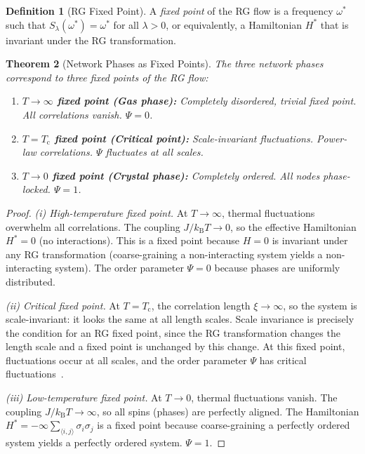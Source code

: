 \documentclass[11pt,twocolumn,a4paper]{article}
\newtheorem{theorem}{Theorem}[section]
\theoremstyle{definition}
\newtheorem{definition}[theorem]{Definition}
\newcommand{\kB}{k_{\mathrm{B}}}
\newcommand{\Tc}{T_{\mathrm{c}}}
\begin{document}
\begin{definition}[RG Fixed Point]\label{def:rg_fixed}
A \emph{fixed point} of the RG flow is a frequency $\omega^*$ such that
$S_\lambda(\omega^*) = \omega^*$ for all $\lambda > 0$, or equivalently, a Hamiltonian
$H^*$ that is invariant under the RG transformation.
\end{definition}

\begin{theorem}[Network Phases as Fixed Points]\label{thm:phases_fixed}
The three network phases correspond to three fixed points of the RG flow:
\begin{enumerate}[label=(\roman*)]
  \item \textbf{$T \to \infty$ fixed point (Gas phase):} Completely disordered, trivial
        fixed point. All correlations vanish. $\Psi = 0$.
  \item \textbf{$T = \Tc$ fixed point (Critical point):} Scale-invariant fluctuations.
        Power-law correlations. $\Psi$ fluctuates at all scales.
  \item \textbf{$T \to 0$ fixed point (Crystal phase):} Completely ordered. All nodes
        phase-locked. $\Psi = 1$.
\end{enumerate}
\end{theorem}

\begin{proof}
\emph{(i) High-temperature fixed point.}
At $T \to \infty$, thermal fluctuations overwhelm all correlations. The coupling
$J/\kB T \to 0$, so the effective Hamiltonian $H^* = 0$ (no interactions). This is
a fixed point because $H = 0$ is invariant under any RG transformation (coarse-graining
a non-interacting system yields a non-interacting system). The order parameter $\Psi = 0$
because phases are uniformly distributed.

\emph{(ii) Critical fixed point.}
At $T = \Tc$, the correlation length $\xi \to \infty$, so the system is scale-invariant:
it looks the same at all length scales. Scale invariance is precisely the condition for
an RG fixed point, since the RG transformation changes the length scale and a fixed point
is unchanged by this change. At this fixed point, fluctuations occur at all scales, and
the order parameter $\Psi$ has critical fluctuations~\cite{wilson1971,onsager1944}.

\emph{(iii) Low-temperature fixed point.}
At $T \to 0$, thermal fluctuations vanish. The coupling $J/\kB T \to \infty$, so all
spins (phases) are perfectly aligned. The Hamiltonian $H^* = -\infty \sum_{\langle i,j\rangle}
\sigma_i\sigma_j$ is a fixed point because coarse-graining a perfectly ordered system
yields a perfectly ordered system. $\Psi = 1$.
\end{proof}
\end{document}
